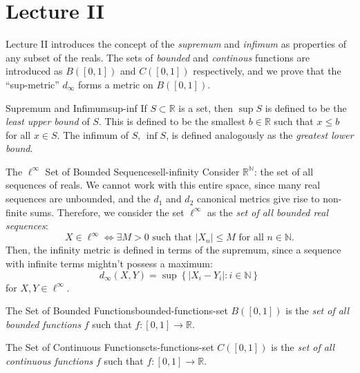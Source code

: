 \documentclass{article}
\numberwithin{equation}{section}
\numberwithin{enumi}{section}
\begin{document}
\section{Lecture II}
Lecture II introduces the concept of the \emph{supremum} and \emph{infimum} as
properties of any subset of the reals. The sets of \emph{bounded} and
\emph{continous} functions are introduced as $ B([0, 1]) $ and $ C([0, 1]) $
respectively, and we prove that the ``sup-metric'' $ d_\infty $ forms a metric
on $ B([0, 1]) $.
\begin{definition}{Supremum and Infimum}{sup-inf}
    If $ S \subset \mathbb{R} $ is a set, then $ \sup S $ is defined to be the
    \emph{least upper bound} of $ S $. This is defined to be the smallest $ b
    \in \mathbb{R} $ such that $ x \leq b $ for all $ x \in S $. The infimum of
    $ S $, $ \inf S $, is defined analogously as the \emph{greatest lower
    bound}.
\end{definition}
\begin{definition}{The \texorpdfstring{$ \ell^\infty $}{Ell-Infinity}
        Set of Bounded Sequences}{ell-infinity}
    Consider $ \mathbb{R}^\mathbb{N} $: the set of all sequences of reals. We
    cannot work with this entire space, since many real sequences are unbounded,
    and the $ d_1 $ and $ d_2 $ canonical metrics give rise to non-finite sums.
    Therefore, we consider the set $ \ell^\infty $ as the \emph{set of
    all bounded real sequences}:
    \begin{equation}
        X \in \ell^\infty \iff \exists M > 0 \text{ such that }
            \vert X_n \vert \leq M \text { for all } n \in \mathbb{N}.
    \end{equation}
    Then, the infinity metric is defined in terms of the supremum, since a
    sequence with infinite terms mightn't possess a maximum:
    \begin{equation}
        d_\infty(X, Y) = \sup\left\{\vert X_i - Y_i \vert \colon
            i \in \mathbb{N}\right\}
    \end{equation}
    for $ X, Y \in \ell^\infty $.
\end{definition}
\begin{definition}{The Set of Bounded Functions}{bounded-functions-set}
    $ B([0,1]) $ is the \emph{set of all bounded functions} $ f $ such that
    $ f \colon [0, 1] \to \mathbb{R} $.
\end{definition}
\begin{definition}{The Set of Continuous Functions}{cts-functions-set}
    $ C([0,1]) $ is the \emph{set of all continuous functions} $ f $ such that
    $ f \colon [0, 1] \to \mathbb{R} $.
\end{definition}
\end{document}
